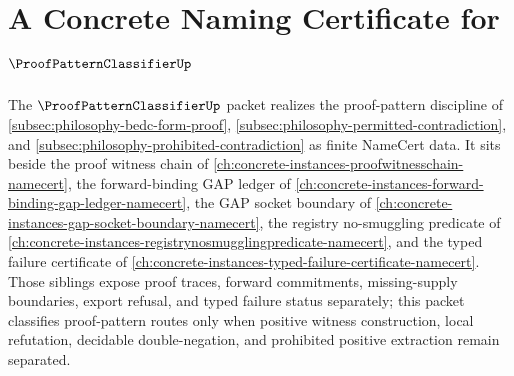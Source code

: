 \chapter{A Concrete Naming Certificate for $\ProofPatternClassifierUp$}
\label{ch:concrete-instances-proof-pattern-classifier-namecert}

The $\ProofPatternClassifierUp$ packet realizes the proof-pattern discipline of \autoref{subsec:philosophy-bedc-form-proof}, \autoref{subsec:philosophy-permitted-contradiction}, and \autoref{subsec:philosophy-prohibited-contradiction} as finite NameCert data. It sits beside the proof witness chain of \autoref{ch:concrete-instances-proofwitnesschain-namecert}, the forward-binding GAP ledger of \autoref{ch:concrete-instances-forward-binding-gap-ledger-namecert}, the GAP socket boundary of \autoref{ch:concrete-instances-gap-socket-boundary-namecert}, the registry no-smuggling predicate of \autoref{ch:concrete-instances-registrynosmugglingpredicate-namecert}, and the typed failure certificate of \autoref{ch:concrete-instances-typed-failure-certificate-namecert}. Those siblings expose proof traces, forward commitments, missing-supply boundaries, export refusal, and typed failure status separately; this packet classifies proof-pattern routes only when positive witness construction, local refutation, decidable double-negation, and prohibited positive extraction remain separated.

